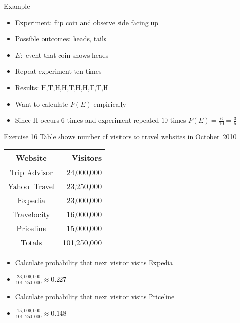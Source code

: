 \documentclass[handout]{beamer}
\theoremstyle{definition}
\begin{document}
\begin{frame}{Example}
\begin{itemize}
\item Experiment: flip coin and observe side facing up
\item Possible outcomes: heads, tails
\item $E:$ event that coin shows heads
\item Repeat experiment ten times
\item Results: H,T,H,H,T,H,H,T,T,H
\item Want to calculate $P\left(E\right)$ empirically
\item Since H occurs $6$ times
and experiment repeated $10$ times
$P\left(E\right)=\frac{6}{10}=\frac{3}{5}$
\end{itemize}
\end{frame}

\begin{frame}{Exercise 16}
Table shows number of visitors to travel websites in October~2010
\begin{center}\begin{tabular}{cr}
Website&Visitors\\\hline
Trip Advisor&24,000,000\\
Yahoo! Travel&23,250,000\\
Expedia&23,000,000\\
Travelocity&16,000,000\\
Priceline&15,000,000\\\hline
Totals&101,250,000
\end{tabular}\end{center}
\begin{itemize}
\item Calculate probability that next visitor visits Expedia
\item $\frac{23,000,000}{101,250,000}\approx 0.227$
\item Calculate probability that next visitor visits Priceline 
\item $\frac{15,000,000}{101,250,000}\approx 0.148$
\end{itemize}
\end{frame}
\end{document}
